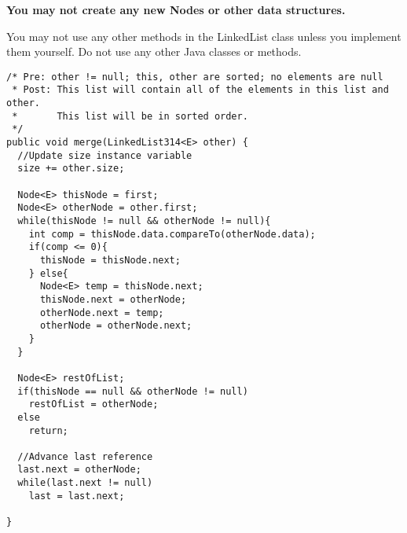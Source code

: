 \documentclass[12pt,letter]{article}
\begin{document}
\noindent \textbf{You may not create any new Nodes or other data structures.}

\noindent You may not use any other methods in the LinkedList class unless you implement them yourself.
\noindent Do not use any other Java classes or methods.

\clearpage
\begin{verbatim}
/* Pre: other != null; this, other are sorted; no elements are null
 * Post: This list will contain all of the elements in this list and other.
 *       This list will be in sorted order.
 */
public void merge(LinkedList314<E> other) {
  //Update size instance variable  
  size += other.size;

  Node<E> thisNode = first;
  Node<E> otherNode = other.first;
  while(thisNode != null && otherNode != null){
    int comp = thisNode.data.compareTo(otherNode.data);
    if(comp <= 0){
      thisNode = thisNode.next;
    } else{
      Node<E> temp = thisNode.next;
      thisNode.next = otherNode;
      otherNode.next = temp;
      otherNode = otherNode.next;
    }
  }

  Node<E> restOfList;
  if(thisNode == null && otherNode != null)
    restOfList = otherNode;
  else
    return;

  //Advance last reference  
  last.next = otherNode;
  while(last.next != null)
    last = last.next;

}
\end{verbatim}
\end{document}
